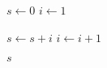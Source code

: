 
\begin{algorithm}[H]
  \begin{algorithmic}[1]
      \State $s \gets 0$
      \State $i \gets 1$
      
      \hStatex
      \State {}
        \State $s \gets s + i$
        \State $i \gets i + 1$
      \EndWhile
      
      \hStatex
      \State \Return $s$
    \EndProcedure
  \end{algorithmic}
\end{algorithm}